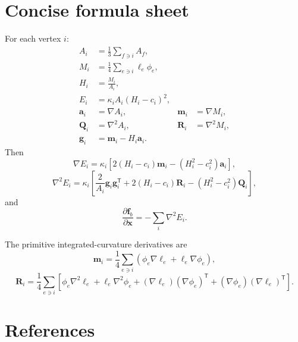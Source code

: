 \documentclass[11pt]{article}
\newcommand{\T}{\mathsf{T}}
\newcommand{\grad}{\nabla}
\newcommand{\Hess}{\nabla^2}
\newcommand{\x}{\mathbf{x}}
\newcommand{\aV}{\mathbf{a}}
\newcommand{\mV}{\mathbf{m}}
\newcommand{\gV}{\mathbf{g}}
\newcommand{\Q}{\mathbf{Q}}
\newcommand{\Mmat}{\mathbf{R}}
\begin{document}
\section{Concise formula sheet}

For each vertex $i$:
\begin{align}
  A_i&=\frac13\sum_{f\ni i}A_f,\\
  M_i&=\frac14\sum_{e\ni i}\ell_e\phi_e,\\
  H_i&=\frac{M_i}{A_i},\\
  E_i&=\kappa_iA_i(H_i-c_i)^2,\\
  \aV_i&=\grad A_i,
  &\mV_i&=\grad M_i,\\
  \Q_i&=\Hess A_i,
  &\Mmat_i&=\Hess M_i,\\
  \gV_i&=\mV_i-H_i\aV_i.
\end{align}
Then
\begin{equation}
  \boxed{
  \grad E_i
  =\kappa_i\left[
    2(H_i-c_i)\mV_i
    -(H_i^2-c_i^2)\aV_i
  \right],}
\end{equation}
\begin{equation}
  \boxed{
  \Hess E_i
  =\kappa_i\left[
    \frac{2}{A_i}\gV_i\gV_i^\T
    +2(H_i-c_i)\Mmat_i
    -(H_i^2-c_i^2)\Q_i
  \right],}
\end{equation}
and
\begin{equation}
  \boxed{
  \frac{\partial\mathbf{f}_b}{\partial\x}
  =-\sum_i\Hess E_i.}
\end{equation}

The primitive integrated-curvature derivatives are
\begin{equation}
  \boxed{
  \mV_i
  =\frac14\sum_{e\ni i}
  \left(\phi_e\grad\ell_e+\ell_e\grad\phi_e\right),}
\end{equation}
\begin{equation}
  \boxed{
  \Mmat_i
  =\frac14\sum_{e\ni i}
  \left[
    \phi_e\Hess\ell_e
    +\ell_e\Hess\phi_e
    +(\grad\ell_e)(\grad\phi_e)^\T
    +(\grad\phi_e)(\grad\ell_e)^\T
  \right].}
\end{equation}

\section{References}
\end{document}
